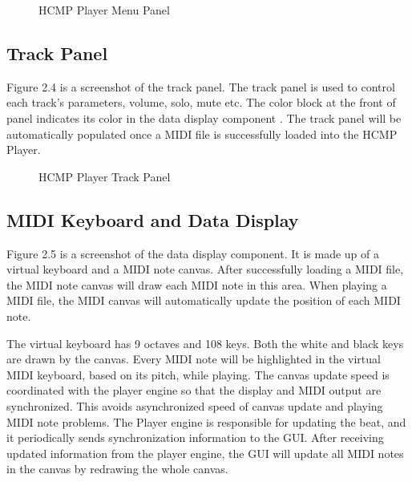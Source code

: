 \begin{figure}[H]
\caption{HCMP Player Menu Panel}
\label{fig:speciation}
\end{figure}

\subsection{Track Panel}

Figure 2.4 is a screenshot of the track panel. The track panel is used to 
control each track's parameters, volume, solo, mute etc. The color
block at the front of panel indicates its color in the data display component . The 
track panel will be automatically populated once a MIDI file is successfully 
loaded into the HCMP Player.
\begin{figure}[H]
\caption{HCMP Player Track Panel}
\label{fig:speciation}
\end{figure}

\subsection{MIDI Keyboard and Data Display}
Figure 2.5 is a screenshot of the data display component. It is made up of a virtual  
keyboard and a MIDI note canvas. After successfully loading a MIDI file, the MIDI 
note canvas will 
draw each MIDI note in this area. When playing a MIDI file, the MIDI canvas will 
automatically update the position of each MIDI note. 

The virtual keyboard has 9 octaves and 108 keys. Both the white and black keys 
are drawn by the canvas. Every MIDI note will be highlighted in the 
virtual MIDI keyboard, based on its pitch, while playing. The canvas update speed is 
coordinated with the player engine so that the display and MIDI 
output are synchronized. This avoids asynchronized speed 
of canvas update and playing MIDI note problems. The Player engine is responsible for 
updating the beat, and it 
periodically sends synchronization information to the GUI. After receiving updated 
information from the player engine, the GUI will update all MIDI notes in the canvas by 
redrawing the whole canvas.

